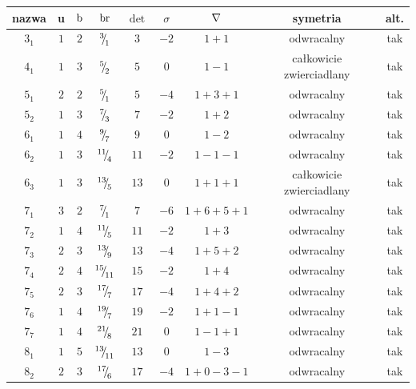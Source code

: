 
\renewcommand*{\arraystretch}{1.4}
\footnotesize
\begin{longtable}{ccccccccc}
\hline
nazwa & u & $\operatorname{b}$ & $\operatorname{br}$ & $\det$ & $\sigma$ & $\nabla$ & symetria & alt. \\ \hline
\endhead %
$3_{1}$ & $1$ & $2$ & ${}^{3}{\mskip -5mu/\mskip -3mu}_{1}$ & $3$ & $-2$ & $1+1$ & odwracalny & tak \\
$4_{1}$ & $1$ & $3$ & ${}^{5}{\mskip -5mu/\mskip -3mu}_{2}$ & $5$ & $0$ & $1-1$ & całkowicie zwierciadlany & tak \\
$5_{1}$ & $2$ & $2$ & ${}^{5}{\mskip -5mu/\mskip -3mu}_{1}$ & $5$ & $-4$ & $1+3+1$ & odwracalny & tak \\
$5_{2}$ & $1$ & $3$ & ${}^{7}{\mskip -5mu/\mskip -3mu}_{3}$ & $7$ & $-2$ & $1+2$ & odwracalny & tak \\
$6_{1}$ & $1$ & $4$ & ${}^{9}{\mskip -5mu/\mskip -3mu}_{7}$ & $9$ & $0$ & $1-2$ & odwracalny & tak \\
$6_{2}$ & $1$ & $3$ & ${}^{11}{\mskip -5mu/\mskip -3mu}_{4}$ & $11$ & $-2$ & $1-1-1$ & odwracalny & tak \\
$6_{3}$ & $1$ & $3$ & ${}^{13}{\mskip -5mu/\mskip -3mu}_{5}$ & $13$ & $0$ & $1+1+1$ & całkowicie zwierciadlany & tak \\
$7_{1}$ & $3$ & $2$ & ${}^{7}{\mskip -5mu/\mskip -3mu}_{1}$ & $7$ & $-6$ & $1+6+5+1$ & odwracalny & tak \\
$7_{2}$ & $1$ & $4$ & ${}^{11}{\mskip -5mu/\mskip -3mu}_{5}$ & $11$ & $-2$ & $1+3$ & odwracalny & tak \\
$7_{3}$ & $2$ & $3$ & ${}^{13}{\mskip -5mu/\mskip -3mu}_{9}$ & $13$ & $-4$ & $1+5+2$ & odwracalny & tak \\
$7_{4}$ & $2$ & $4$ & ${}^{15}{\mskip -5mu/\mskip -3mu}_{11}$ & $15$ & $-2$ & $1+4$ & odwracalny & tak \\
$7_{5}$ & $2$ & $3$ & ${}^{17}{\mskip -5mu/\mskip -3mu}_{7}$ & $17$ & $-4$ & $1+4+2$ & odwracalny & tak \\
$7_{6}$ & $1$ & $4$ & ${}^{19}{\mskip -5mu/\mskip -3mu}_{7}$ & $19$ & $-2$ & $1+1-1$ & odwracalny & tak \\
$7_{7}$ & $1$ & $4$ & ${}^{21}{\mskip -5mu/\mskip -3mu}_{8}$ & $21$ & $0$ & $1-1+1$ & odwracalny & tak \\
$8_{1}$ & $1$ & $5$ & ${}^{13}{\mskip -5mu/\mskip -3mu}_{11}$ & $13$ & $0$ & $1-3$ & odwracalny & tak \\
$8_{2}$ & $2$ & $3$ & ${}^{17}{\mskip -5mu/\mskip -3mu}_{6}$ & $17$ & $-4$ & $1+0-3-1$ & odwracalny & tak \\

\end{longtable}
